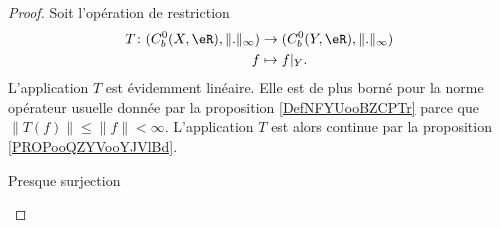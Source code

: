 \begin{proof}
    Soit l'opération de restriction
    \begin{equation}
        \begin{aligned}
            T\colon (C^0_b(X,\eR),\| . \|_{\infty})&\to (C^0_b(Y,\eR),\| . \|_{\infty}) \\
            f&\mapsto f|_Y. 
        \end{aligned}
    \end{equation}
    L'application \( T\) est évidemment linéaire. Elle est de plus borné pour la norme opérateur usuelle donnée par la proposition \ref{DefNFYUooBZCPTr} parce que \( \| T(f) \|\leq \| f \|<\infty\). L'application \( T\) est alors continue par la proposition \ref{PROPooQZYVooYJVlBd}.

    \begin{subproof}
    \item[Presque surjection]


\end{subproof}
\end{proof}
